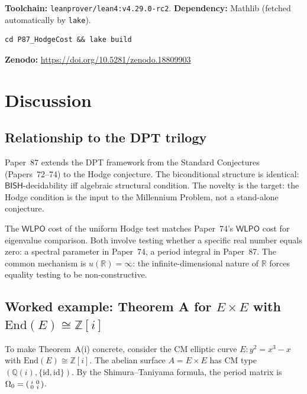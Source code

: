 \documentclass[11pt]{article}
\theoremstyle{plain}
\theoremstyle{definition}
\theoremstyle{remark}
\newcommand{\Z}{\mathbb{Z}}
\newcommand{\Q}{\mathbb{Q}}
\newcommand{\R}{\mathbb{R}}
\newcommand{\End}{\mathrm{End}}
\newcommand{\BISH}{\ensuremath{\mathsf{BISH}}}
\newcommand{\WLPO}{\ensuremath{\mathsf{WLPO}}}
\begin{document}
\textbf{Toolchain:} \texttt{leanprover/lean4:v4.29.0-rc2}.
\textbf{Dependency:} Mathlib (fetched automatically by \texttt{lake}).

\begin{verbatim}
cd P87_HodgeCost && lake build
\end{verbatim}

\noindent
\textbf{Zenodo:} \url{https://doi.org/10.5281/zenodo.18809903}

\section{Discussion}\label{sec:discussion}

\subsection{Relationship to the DPT trilogy}

Paper~87 extends the DPT framework from the Standard Conjectures (Papers~72--74) to the Hodge conjecture. The biconditional structure is identical: $\BISH$-decidability iff algebraic structural condition. The novelty is the target: the Hodge condition is the input to the Millennium Problem, not a stand-alone conjecture.

The $\WLPO$ cost of the uniform Hodge test matches Paper~74's $\WLPO$ cost for eigenvalue comparison. Both involve testing whether a specific real number equals zero: a spectral parameter in Paper~74, a period integral in Paper~87. The common mechanism is $u(\R) = \infty$: the infinite-dimensional nature of $\R$ forces equality testing to be non-constructive.

\subsection{Worked example: Theorem A for $E \times E$ with $\End(E) \cong \Z[i]$}

To make Theorem~A(i) concrete, consider the CM elliptic curve $E: y^2 = x^3 - x$ with $\End(E) \cong \Z[i]$. The abelian surface $A = E \times E$ has CM type $(\Q(i), \{\mathrm{id}, \mathrm{id}\})$. By the Shimura--Taniyama formula, the period matrix is $\Omega_0 = \begin{psmallmatrix} i & 0 \\ 0 & i \end{psmallmatrix}$.
\end{document}
